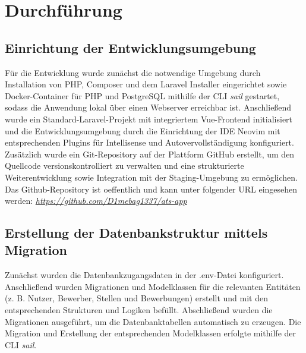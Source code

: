 \section{Durchführung}
\subsection{Einrichtung der Entwicklungsumgebung}
Für die Entwicklung wurde zunächst die notwendige Umgebung durch Installation von PHP, Composer und dem Laravel Installer eingerichtet sowie Docker-Container für PHP und PostgreSQL mithilfe der CLI \textit{sail} gestartet, sodass die Anwendung lokal über einen Webserver erreichbar ist. 
Anschließend wurde ein Standard-Laravel-Projekt mit integriertem Vue-Frontend initialisiert und die Entwicklungsumgebung durch die Einrichtung der IDE Neovim mit entsprechenden Plugins für Intellisense und Autovervollständigung konfiguriert.
Zusätzlich wurde ein Git-Repository auf der Plattform GitHub erstellt, um den Quellcode versionskontrolliert zu verwalten und eine strukturierte Weiterentwicklung sowie Integration mit der Staging-Umgebung zu ermöglichen. 
Das Github-Repository ist oeffentlich und kann unter folgender URL eingesehen werden: \textit{\url{https://github.com/D1mebag1337/ats-app}}
\subsection{Erstellung der Datenbankstruktur mittels Migration}
Zunächst wurden die Datenbankzugangsdaten in der .env-Datei konfiguriert. 
Anschließend wurden Migrationen und Modelklassen für die relevanten Entitäten (z. B. Nutzer, Bewerber, Stellen und Bewerbungen) erstellt und mit den entsprechenden Strukturen und Logiken befüllt. 
Abschließend wurden die Migrationen ausgeführt, um die Datenbanktabellen automatisch zu erzeugen.
Die Migration und Erstellung der entsprechenden Modelklassen erfolgte mithilfe der CLI \textit{sail}.
